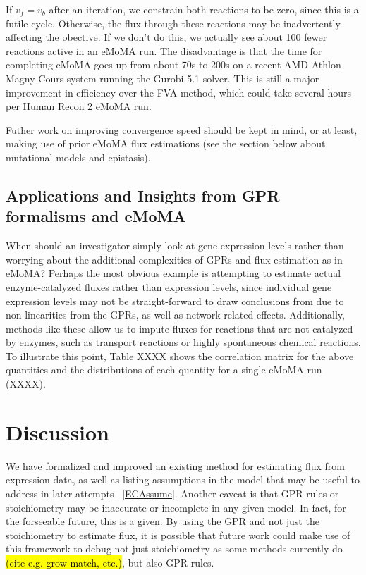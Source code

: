 \documentclass[phd,tocprelim]{cornell}
\theoremstyle{break}
\begin{document}
If $v_f = v_b$ after an iteration, we constrain both reactions to be zero, since this
is a futile cycle. Otherwise, the flux through these reactions may be inadvertently affecting
the obective. If we don't do this, we actually see about 100 fewer reactions active in an eMoMA run.
The disadvantage is that the time for completing eMoMA goes up from about 70s to 200s on a recent
AMD Athlon Magny-Cours system running the Gurobi 5.1 solver. This is still a major improvement 
in efficiency over the FVA method, which could take several hours per Human Recon 2 eMoMA run.

Futher work on improving convergence speed should be kept in mind, or at least, making use of prior
eMoMA flux estimations (see the section below about mutational models and epistasis).

\subsection{Applications and Insights from GPR formalisms and eMoMA}
When should an investigator simply look at gene expression levels rather than
worrying about the additional complexities of GPRs and flux estimation as in eMoMA?
Perhaps the most obvious example is attempting to estimate actual enzyme-catalyzed 
fluxes rather than expression levels, since individual gene expression levels
may not be straight-forward to draw conclusions from due to non-linearities
from the GPRs, as well as network-related effects. Additionally, methods like these
allow us to impute fluxes for reactions that are not catalyzed by enzymes,
such as transport reactions or highly spontaneous chemical reactions. To illustrate
this point, Table XXXX shows the correlation matrix for the above quantities and 
the distributions of each quantity for a single eMoMA run (XXXX).

\section{Discussion}
We have formalized and improved an existing method for estimating flux
from expression data, as well as listing assumptions in the model that
may be useful to address in later attempts ~\ref{ECAssume}. Another
caveat is that GPR rules or stoichiometry may be inaccurate or
incomplete in any given model. In fact, for the forseeable future,
this is a given. By using the GPR and not just the stoichiometry to
estimate flux, it is possible that future work could make use of this
framework to debug not just stoichiometry as some methods currently do
\hl{(cite e.g. grow match, etc.)}, but also GPR rules.
\end{document}
